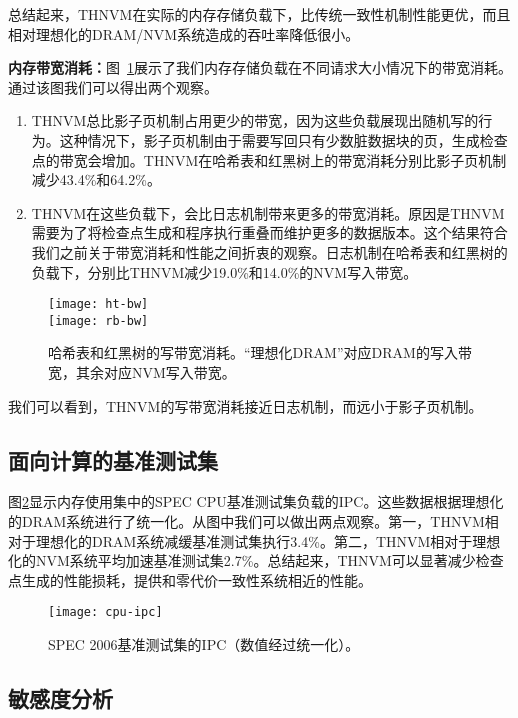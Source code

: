 总结起来，THNVM在实际的内存存储负载下，比传统一致性机制性能更优，而且相对理想化的DRAM/NVM系统造成的吞吐率降低很小。 

\textbf{内存带宽消耗：}图~\ref{fig:rb-bw}展示了我们内存存储负载在不同请求大小情况下的带宽消耗。通过该图我们可以得出两个观察。
\begin{enumerate}
\item THNVM总比影子页机制占用更少的带宽，因为这些负载展现出随机写的行为。这种情况下，影子页机制由于需要写回只有少数脏数据块的页，生成检查点的带宽会增加。THNVM在哈希表和红黑树上的带宽消耗分别比影子页机制减少43.4\%和64.2\%。
\item THNVM在这些负载下，会比日志机制带来更多的带宽消耗。原因是THNVM需要为了将检查点生成和程序执行重叠而维护更多的数据版本。这个结果符合我们之前关于带宽消耗和性能之间折衷的观察。日志机制在哈希表和红黑树的负载下，分别比THNVM减少19.0\%和14.0\%的NVM写入带宽。
\end{enumerate}

\begin{figure}[!h]
\centering
\texttt{[image: ht-bw]}\\
\texttt{[image: rb-bw]}\\
\caption{哈希表和红黑树的写带宽消耗。``理想化DRAM''对应DRAM的写入带宽，其余对应NVM写入带宽。}
\label{fig:rb-bw}
\end{figure}

我们可以看到，THNVM的写带宽消耗接近日志机制，而远小于影子页机制。

\subsection{面向计算的基准测试集}

图\ref{fig:cpu-ipc}显示内存使用集中的SPEC CPU基准测试集负载的IPC。这些数据根据理想化的DRAM系统进行了统一化。从图中我们可以做出两点观察。第一，THNVM相对于理想化的DRAM系统减缓基准测试集执行3.4\%。第二，THNVM相对于理想化的NVM系统平均加速基准测试集2.7\%。总结起来，THNVM可以显著减少检查点生成的性能损耗，提供和零代价一致性系统相近的性能。
 
\begin{figure}[!h]
  \centering
  \texttt{[image: cpu-ipc]}
  \caption{SPEC 2006基准测试集的IPC（数值经过统一化）。}
  \label{fig:cpu-ipc}
\end{figure}
 
\subsection{敏感度分析}

